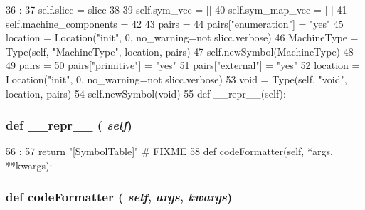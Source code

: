 \begin{DoxyCode}
36                              :
37         self.slicc = slicc
38 
39         self.sym_vec = []
40         self.sym_map_vec = [ {} ]
41         self.machine_components = {}
42 
43         pairs = {}
44         pairs["enumeration"] = "yes"
45         location = Location("init", 0, no_warning=not slicc.verbose)
46         MachineType = Type(self, "MachineType", location, pairs)
47         self.newSymbol(MachineType)
48 
49         pairs = {}
50         pairs["primitive"] = "yes"
51         pairs["external"] = "yes"
52         location = Location("init", 0, no_warning=not slicc.verbose)
53         void = Type(self, "void", location, pairs)
54         self.newSymbol(void)
55 
    def __repr__(self):
\end{DoxyCode}
\hypertarget{classslicc_1_1symbols_1_1SymbolTable_1_1SymbolTable_ad8b9328939df072e4740cd9a63189744}{
\subsubsection[{\_\-\_\-repr\_\-\_\-}]{\setlength{\rightskip}{0pt plus 5cm}def \_\-\_\-repr\_\-\_\- ( {\em self})}}
\label{classslicc_1_1symbols_1_1SymbolTable_1_1SymbolTable_ad8b9328939df072e4740cd9a63189744}



\begin{DoxyCode}
56                       :
57         return "[SymbolTable]" # FIXME
58 
    def codeFormatter(self, *args, **kwargs):
\end{DoxyCode}
\hypertarget{classslicc_1_1symbols_1_1SymbolTable_1_1SymbolTable_a68362f78121a5495eaa849608e1bed7a}{
\subsubsection[{codeFormatter}]{\setlength{\rightskip}{0pt plus 5cm}def codeFormatter ( {\em self}, \/   {\em args}, \/   {\em kwargs})}}
\label{classslicc_1_1symbols_1_1SymbolTable_1_1SymbolTable_a68362f78121a5495eaa849608e1bed7a}



